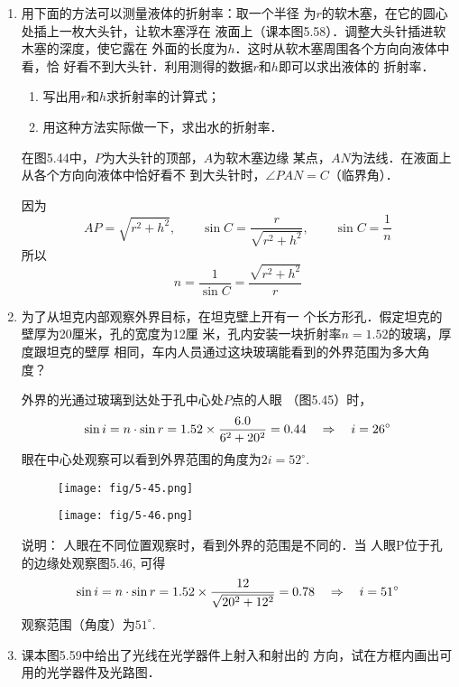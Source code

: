 \begin{enumerate}
\item 用下面的方法可以测量液体的折射率：取一个半径
为$r$的软木塞，在它的圆心处插上一枚大头针，让软木塞浮在
液面上（课本图5.58）．调整大头针插进软木塞的深度，使它露在
外面的长度为$h$．这时从软木塞周围各个方向向液体中看，恰
好看不到大头针．利用测得的数据$r$和$h$即可以求出液体的
折射率．
\begin{enumerate}
    \item 写出用$r$和$h$求折射率的计算式；
    \item 用这种方法实际做一下，求出水的折射率．
\end{enumerate}

\begin{solution}
    在图5.44中，$P$为大头针的顶部，$A$为软木塞边缘
某点，$AN$为法线．在液面上从各个方向向液体中恰好看不
到大头针时，$\angle PAN=C$（临界角）．

因为    
\[AP=\sqrt{r^2+h^2},\qquad \sin C=\frac{r}{\sqrt{r^2+h^2}},\qquad \sin C=\frac{1}{n}\]
所以
\[n=\frac{1}{\sin C}=\frac{\sqrt{r^2+h^2}}{r}\]
\end{solution}


\item 为了从坦克内部观察外界目标，在坦克壁上开有一
个长方形孔．假定坦克的壁厚为20厘米，孔的宽度为12厘
米，孔内安装一块折射率$n=1.52$的玻璃，厚度跟坦克的壁厚
相同，车内人员通过这块玻璃能看到的外界范围为多大角度？

\begin{solution}
    外界的光通过玻璃到达处于孔中心处$P$点的人眼
    （图5.45）时，
\[\sin i=n\cdot \sin r=1.52\times \frac{6.0}{6^2+20^2}=0.44\quad \Rightarrow\quad i=26^{\circ}\]
眼在中心处观察可以看到外界范围的角度为$2i=52^{\circ}$.
\begin{figure}[htp]\centering
    \begin{minipage}[t]{0.48\textwidth}
    \centering
\texttt{[image: fig/5-45.png]}
    \caption{}
    \end{minipage}
    \begin{minipage}[t]{0.48\textwidth}
    \centering
\texttt{[image: fig/5-46.png]}
    \caption{}
    \end{minipage}
    \end{figure}

说明：
人眼在不同位置观察时，看到外界的范围是不同的．当
人眼P位于孔的边缘处观察图5.46, 可得
\[\sin i=n\cdot \sin r =1.52\times \frac{12}{\sqrt{20^2+12^2}}=0.78\quad \Rightarrow\quad i=51^{\circ}\]
观察范围（角度）为$51^{\circ}$.

\end{solution}
\item 课本图5.59中给出了光线在光学器件上射入和射出的
方向，试在方框内画出可用的光学器件及光路图．


\end{enumerate}
